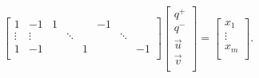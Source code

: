 \begin{equation*}
  \begin{bmatrix}
    1      & -1     & 1 &        &   & -1 &        &    \\
    \vdots & \vdots &   & \ddots &   &    & \ddots &    \\
    1      & -1     &   &        & 1 &    &        & -1 \\
  \end{bmatrix}
  \begin{bmatrix}
    q^{+} \\ q^{-} \\ \vec{u} \\ \vec{v} \\
  \end{bmatrix}
  =
  \begin{bmatrix}
    x_1 \\ \vdots \\ x_m \\
  \end{bmatrix}.
\end{equation*}
